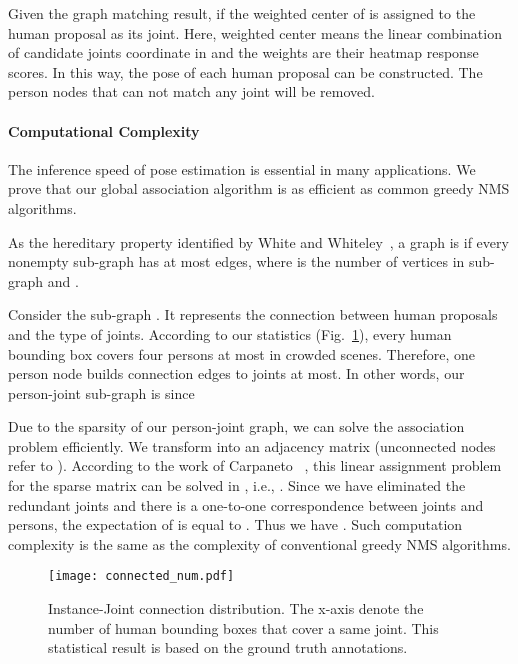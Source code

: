 \documentclass[10pt,twocolumn,letterpaper]{article}
\begin{document}
Given the graph matching result, if  the weighted center of  is assigned to the  human proposal as its  joint. Here, weighted center means the linear combination of candidate joints coordinate in  and the weights are their heatmap response scores. In this way, the pose of each human proposal can be constructed. The person nodes that can not match any joint will be removed.

\vspace{-0.1in}
\paragraph{Computational Complexity}
The inference speed of pose estimation is essential in many applications. We prove that our global association algorithm is as efficient as common greedy NMS algorithms.

As the hereditary property identified by White and Whiteley~\cite{klsparse}, a graph  is  if every nonempty sub-graph  has at most  edges, where  is the number of vertices in sub-graph  and .

Consider the sub-graph . It represents the connection between human proposals and the  type of joints. According to our statistics (Fig.~\ref{fig:cruve}), every human bounding box covers four persons at most in crowded scenes. Therefore, one person node builds connection edges to  joints at most. In other words, our person-joint sub-graph  is  since


Due to the sparsity of our person-joint graph, we can solve the association problem efficiently. We transform  into an adjacency matrix  (unconnected nodes refer to ). According to the work of Carpaneto \etal~\cite{complexity}, this linear assignment problem for the sparse matrix can be solved in , i.e., . Since we have eliminated the redundant joints and there is a one-to-one correspondence between joints and persons, the expectation of  is equal to . Thus we have . Such computation complexity is the same as the complexity of conventional greedy NMS algorithms.

\begin{figure}[htb]
\begin{center}
\texttt{[image: connected\_num.pdf]}
\end{center}
   \caption{Instance-Joint connection distribution. The x-axis denote the number of human bounding boxes that cover a same joint. This statistical result is based on the ground truth annotations.}
\label{fig:cruve}
\vspace{-0.15in}
\end{figure}
\end{document}
